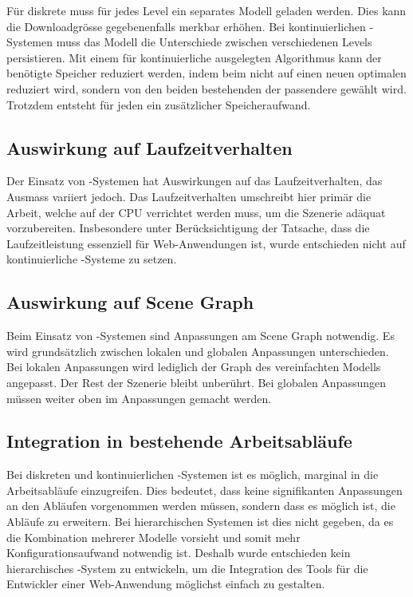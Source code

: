 Für diskrete  muss für jedes Level ein separates Modell geladen werden. Dies kann die Downloadgrösse gegebenenfalls merkbar erhöhen. Bei kontinuierlichen -Systemen muss das Modell die Unterschiede zwischen verschiedenen Levels persistieren. Mit einem für kontinuierliche  ausgelegten Algorithmus kann der benötigte Speicher reduziert werden, indem beim  nicht auf einen neuen optimalen  reduziert wird, sondern von den beiden bestehenden  der passendere gewählt wird. Trotzdem entsteht für jeden  ein zusätzlicher Speicheraufwand.

\subsection{Auswirkung auf Laufzeitverhalten}

Der Einsatz von -Systemen hat Auswirkungen auf das Laufzeitverhalten, das Ausmass variiert jedoch. Das Laufzeitverhalten umschreibt hier primär die Arbeit, welche auf der \gls{CPU} verrichtet werden muss, um die Szenerie adäquat vorzubereiten.
Insbesondere unter Berücksichtigung der Tatsache, dass die Laufzeitleistung essenziell für Web-Anwendungen ist, wurde entschieden nicht auf kontinuierliche -Systeme zu setzen.

\subsection{Auswirkung auf Scene Graph}
Beim Einsatz von -Systemen sind Anpassungen am \gls{Scene Graph} notwendig. Es wird grundsätzlich zwischen lokalen und globalen Anpassungen unterschieden. Bei lokalen Anpassungen wird lediglich der Graph des vereinfachten Modells angepasst. Der Rest der Szenerie bleibt unberührt. Bei globalen Anpassungen müssen weiter oben im  Anpassungen gemacht werden.

\subsection{Integration in bestehende Arbeitsabläufe}

Bei diskreten und kontinuierlichen -Systemen ist es möglich, marginal in die Arbeitsabläufe einzugreifen. Dies bedeutet, dass keine signifikanten Anpassungen an den Abläufen vorgenommen werden müssen, sondern dass es möglich ist, die Abläufe zu erweitern.
Bei hierarchischen Systemen ist dies nicht gegeben, da es die Kombination mehrerer Modelle vorsieht und somit mehr Konfigurationsaufwand notwendig ist.
Deshalb wurde entschieden kein hierarchisches -System zu entwickeln, um die Integration des Tools für die Entwickler einer Web-Anwendung möglichst einfach zu gestalten.

